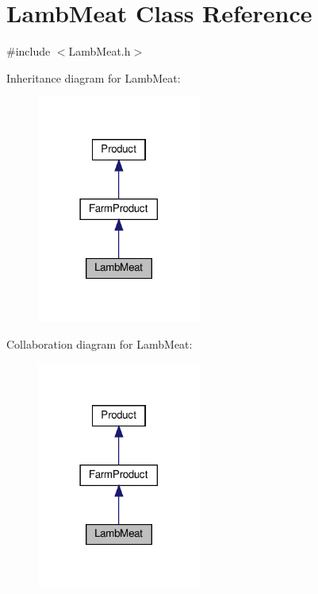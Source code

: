 \hypertarget{classLambMeat}{}\section{Lamb\+Meat Class Reference}
\label{classLambMeat}


{\ttfamily \#include $<$Lamb\+Meat.\+h$>$}



Inheritance diagram for Lamb\+Meat\+:
\nopagebreak
\begin{figure}[H]
\begin{center}
\leavevmode
\includegraphics[width=153pt]{classLambMeat__inherit__graph}
\end{center}
\end{figure}


Collaboration diagram for Lamb\+Meat\+:
\nopagebreak
\begin{figure}[H]
\begin{center}
\leavevmode
\includegraphics[width=153pt]{classLambMeat__coll__graph}
\end{center}
\end{figure}
